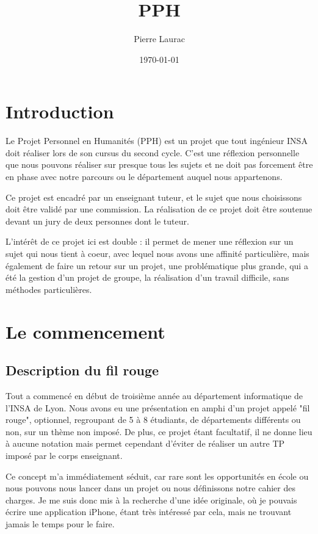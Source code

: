 \documentclass{article}
\title{PPH}
\author{Pierre Laurac}
\date\today
\begin{document}
\maketitle

\tableofcontents
\newpage
\section{Introduction}
Le Projet Personnel en Humanités (PPH) est un projet que tout ingénieur INSA doit réaliser lors de son cursus du second cycle. C'est une réflexion personnelle que nous pouvons réaliser sur presque tous les sujets et ne doit pas forcement être en phase avec notre parcours ou le département auquel nous appartenons.

Ce projet est encadré par un enseignant tuteur, et le sujet que nous choisissons doit être validé par une commission. La réalisation de ce projet doit être soutenue devant un jury de deux personnes dont le tuteur. 

L'intérêt de ce projet ici est double : il permet de mener une réflexion sur un sujet qui nous tient à coeur, avec lequel nous avons une affinité particulière, mais également de faire un retour sur un projet, une problématique plus grande, qui a été la gestion d'un projet de groupe, la réalisation d'un travail difficile, sans méthodes particulières.
\section{Le commencement}
\subsection{Description du fil rouge}
	Tout a commencé en début de troisième année au département informatique de l'INSA de Lyon. Nous avons eu une présentation en amphi d'un projet appelé "fil rouge", optionnel, regroupant de 5 à 8 étudiants, de départements différents ou non, sur un thème non imposé. De plus, ce projet étant facultatif, il ne donne lieu à aucune notation mais permet cependant d'éviter de réaliser un autre TP imposé par le corps enseignant.
	
	Ce concept m’a immédiatement séduit, car rare sont les opportunités en école ou nous pouvons nous lancer dans un projet ou nous définissons notre cahier des charges. Je me suis donc mis à la recherche d’une idée originale, où je pouvais écrire une application iPhone, étant très intéressé par cela, mais ne trouvant jamais le temps pour le faire.
	
\end{document}
